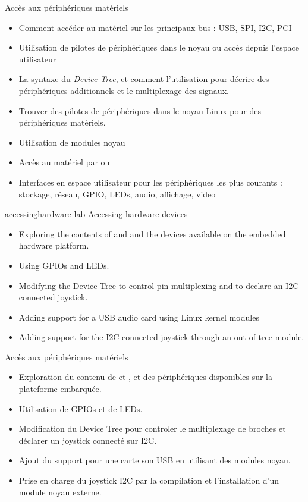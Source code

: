 {Accès aux périphériques matériels}
{
  \begin{itemize}
  \item Comment accéder au matériel sur les principaux bus : USB, SPI,
    I2C, PCI
  \item Utilisation de pilotes de périphériques dans le noyau ou accès
    depuis l'espace utilisateur
  \item La syntaxe du {\em Device Tree}, et comment l'utilisation pour
    décrire des périphériques additionnels et le multiplexage des
    signaux.
  \item Trouver des pilotes de périphériques dans le noyau Linux pour
    des périphériques matériels.
  \item Utilisation de modules noyau
  \item Accès au matériel par  ou 
  \item Interfaces en espace utilisateur pour les périphériques les
    plus courants : stockage, réseau, GPIO, LEDs, audio, affichage,
    video
  \end{itemize}
}
{accessinghardware}
{lab}
{Accessing hardware devices}
{
  \begin{itemize}
  \item Exploring the contents of  and  and the
    devices available on the embedded hardware platform.
  \item Using GPIOs and LEDs.
  \item Modifying the Device Tree to control pin multiplexing and
        to declare an I2C-connected joystick.
  \item Adding support for a USB audio card using Linux kernel modules
  \item Adding support for the I2C-connected joystick through
        an out-of-tree module.
  \end{itemize}
}
{Accès aux périphériques matériels}
{
  \begin{itemize}
  \item Exploration du contenu de  et , et des
    périphériques disponibles sur la plateforme embarquée.
  \item Utilisation de GPIOs et de LEDs.
  \item Modification du Device Tree pour controler le multiplexage
    de broches et déclarer un joystick connecté sur I2C.
  \item Ajout du support pour une carte son USB en utilisant des
    modules noyau.
  \item Prise en charge du joystick I2C par la compilation et
    l'installation d'un module noyau externe.
  \end{itemize}
}
